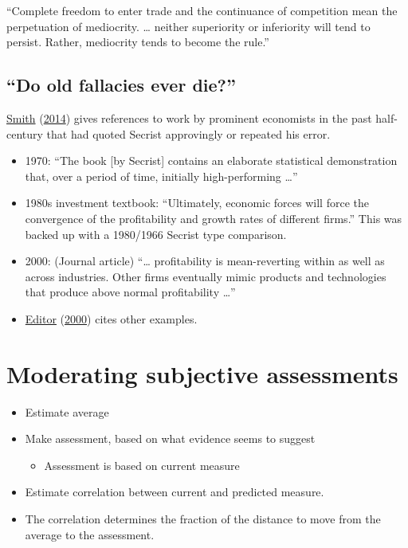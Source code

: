 \documentclass[
  10pt,
  b5paper]{book}
\providecommand{\tightlist}{%
  \setlength{\itemsep}{0pt}\setlength{\parskip}{0pt}}
\begin{document}
``Complete freedom to enter trade and the continuance of competition
mean the perpetuation of mediocrity. \ldots{} neither superiority or
inferiority will tend to persist. Rather, mediocrity tends to become
the rule.''

\hypertarget{do-old-fallacies-ever-die}{%
\subsection*{``Do old fallacies ever die?''}\label{do-old-fallacies-ever-die}}

\protect\hyperlink{ref-smith-sd}{Smith} (\protect\hyperlink{ref-smith-sd}{2014}) gives references to work by prominent economists in the past
half-century that had quoted Secrist approvingly or repeated his error.

\begin{itemize}
\tightlist
\item
  1970: ``The book {[}by Secrist{]} contains an elaborate statistical
  demonstration that, over a period of time, initially high-performing \ldots{}''
\item
  1980s investment textbook: ``Ultimately, economic forces will force
  the convergence of the profitability and growth rates of different firms.''
  This was backed up with a 1980/1966 Secrist type comparison.
\item
  2000: (Journal article) ``\ldots{} profitability is mean-reverting within
  as well as across industries. Other firms eventually mimic products
  and technologies that produce above normal profitability \ldots{}''
\item
  \protect\hyperlink{ref-wainer-regress}{Editor} (\protect\hyperlink{ref-wainer-regress}{2000}) cites other examples.
\end{itemize}

\hypertarget{moderating-subjective-assessments}{%
\section{Moderating subjective assessments}\label{moderating-subjective-assessments}}

\begin{itemize}
\tightlist
\item
  Estimate average
\item
  Make assessment, based on what evidence seems to suggest

  \begin{itemize}
  \tightlist
  \item
    Assessment is based on current measure
  \end{itemize}
\item
  Estimate correlation between current and predicted measure.
\item
  The correlation determines the fraction of the distance
  to move from the average to the assessment.
\end{itemize}
\end{document}
